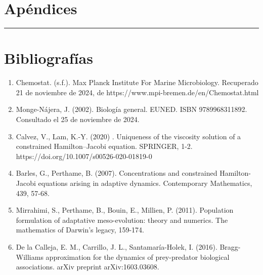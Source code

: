 \documentclass[letterpaper]{article}
\begin{document}
    \section{Apéndices}

    \vspace{0.2cm}
        \rule{150mm}{0.5mm} %
    \vspace{0.2cm}

    	
     
    \section{Bibliografías}

    \begin{enumerate}
        \item {

            \normalsize{Chemostat. (s.f.). Max Planck Institute For Marine Microbiology. Recuperado 21 de noviembre de 2024, de https://www.mpi-bremen.de/en/Chemostat.html}

        }

        \item {

            \normalsize{Monge-Nájera, J. (2002). Biología general. EUNED. ISBN 9789968311892. Consultado el 25 de noviembre de 2024.}
        
        }

        \item{
            \normalsize{Calvez, V., Lam, K.-Y. (2020) . Uniqueness of the viscosity solution of a constrained Hamilton–Jacobi equation. SPRINGER, 1-2. https://doi.org/10.1007/s00526-020-01819-0} 
        }

        \item {
            \normalsize{Barles, G., Perthame, B. (2007). Concentrations and constrained Hamilton-Jacobi equations arising in adaptive dynamics. Contemporary Mathematics, 439, 57-68.}
        }

        \item{
            \normalsize{Mirrahimi, S., Perthame, B., Bouin, E., Millien, P. (2011). Population formulation of adaptative meso-evolution: theory and numerics. The mathematics of Darwin’s legacy, 159-174.}
        }

        \item{
            \normalsize{De la Calleja, E. M., Carrillo, J. L., Santamaría-Holek, I. (2016). Bragg-Williams approximation for the dynamics of prey-predator biological associations. arXiv preprint arXiv:1603.03608.}
        }
    \end{enumerate}

 
\end{document}
